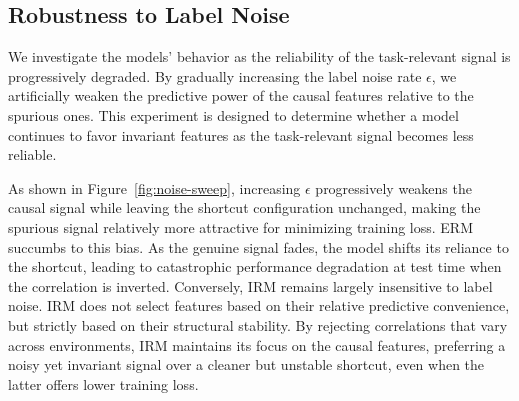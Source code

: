 \documentclass[11pt]{article}
\theoremstyle{definition}
\theoremstyle{plain}
\begin{document}
\subsection{Robustness to Label Noise}
\label{sec:noise-sweep}

We investigate the models' behavior as the reliability of the task-relevant signal is progressively degraded. By gradually increasing the label noise rate $\epsilon$, we artificially weaken the predictive power of the causal features relative to the spurious ones. This experiment is designed to determine whether a model continues to favor invariant features as the task-relevant signal becomes less reliable.

As shown in Figure~\ref{fig:noise-sweep}, increasing $\epsilon$ progressively weakens the causal signal while leaving the shortcut configuration unchanged, making the spurious signal relatively more attractive for minimizing training loss. ERM succumbs to this bias. As the genuine signal fades, the model shifts its reliance to the shortcut, leading to catastrophic performance degradation at test time when the correlation is inverted. Conversely, IRM remains largely insensitive to label noise. IRM does not select features based on their relative predictive convenience, but strictly based on their structural stability. By rejecting correlations that vary across environments, IRM maintains its focus on the causal features, preferring a noisy yet invariant signal over a cleaner but unstable shortcut, even when the latter offers lower training loss.
\end{document}
